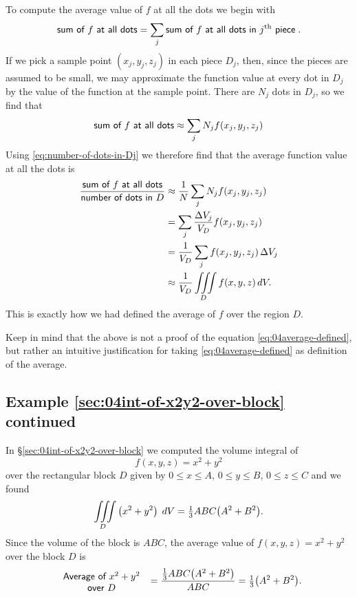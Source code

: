 To compute the average value of $f$ at all the dots we begin with
\[
\text{\sffamily sum of $f$ at all dots}
=\sum_j \text{\sffamily sum of $f$ at all dots in $j^{\rm th}$ piece} \;.
\]
If we pick a sample point $(x_j,y_j,z_j)$ in each piece $D_j$, then,
since the pieces are assumed to be small, we may approximate the
function value at every dot in $D_j$ by the value of the function at the
sample point.  There are $N_j$ dots in $D_j$, so we find that 
\[
\text{\sffamily sum of $f$ at all dots}
\approx \sum_j N_j f(x_j, y_j, z_j)
\]
Using \eqref{eq:number-of-dots-in-Dj} we therefore find that the average
function value at all the dots is
\begin{align*}
  \frac{\text{\sffamily sum of $f$ at all dots}}
       {\text{\sffamily number of dots in $D$}}
  &\approx \frac1N\sum_j N_j f(x_j, y_j, z_j) \\
  &=\sum_j \frac{\Delta V_j}{V_D}f(x_j, y_j, z_j) \\
  &=\frac 1{V_D} \sum_j f(x_j, y_j, z_j)\,\Delta V_j \\
  &\approx \frac1{V_D} \iiint\limits_D f(x,y,z)\, dV.
\end{align*}
This is exactly how we had defined the average of $f$ over the region $D$.

Keep in mind that the above is not a proof of the equation
\eqref{eq:04average-defined}, but rather an intuitive justification for
taking \eqref{eq:04average-defined} as definition of the average.

\subsection{Example \ref{sec:04int-of-x2y2-over-block} continued} 
In \S\ref{sec:04int-of-x2y2-over-block} we computed the volume
integral of
\[
f(x, y, z) = x^2+y^2
\]
over the rectangular block $D$ given by $0\le x\le A$, $0\le y\le B$,
$0\le z\le C$ and we found
\[
\iiint\limits_D \left( x^2+y^2 \right)\; dV = \tfrac13 ABC\bigl(A^2+B^2\bigr).
\]
Since the volume of the block is $ABC$, the average value of
$f(x, y, z) = x^2+y^2$ over the block $D$ is 
\[
    \parbox{96pt}{\centering\sffamily Average of $x^2 + y^2$\\ over $D$ }
=
\frac{\tfrac13 ABC\bigl(A^2+B^2\bigr)}{ABC}
=
\tfrac13 \bigl(A^2 + B^2\bigr).
\]

